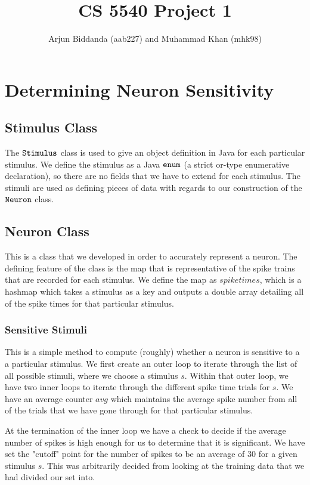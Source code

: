 \documentclass[12pt]{article} %
\title{CS 5540 Project 1}
\author{Arjun Biddanda (aab227) and Muhammad Khan (mhk98)}
\begin{document}
\maketitle

\section{Determining Neuron Sensitivity}
\subsection{Stimulus Class}
The $\tt{Stimulus}$ class is used to give an object definition in Java for each particular stimulus. We define the stimulus as a Java $\tt{enum}$ (a strict or-type enumerative declaration), so there are no fields that we have to extend for each stimulus. The stimuli are used as defining pieces of data with regards to our construction of the $\tt{Neuron}$ class.

\subsection{Neuron Class}
This is a class that we developed in order to accurately represent a neuron. The defining feature of the class is the map that is representative of the spike trains that are recorded for each stimulus. We define the map as $spiketimes$, which is a hashmap which takes a stimulus as a key and outputs a double array detailing all of the spike times for that particular stimulus. 
\subsubsection{Sensitive Stimuli}
This is a simple method to compute (roughly) whether a neuron is sensitive to a a particular stimulus. We first create an outer loop to iterate through the list of all possible stimuli, where we choose a stimulus $s$. Within that outer loop, we have two inner loops to iterate through the different spike time trials for $s$. We have an average counter $avg$ which maintains the average spike number from all of the trials that we have gone through for that particular stimulus. 

At the termination of the inner loop we have a check to decide if the average number of spikes is high enough for us to determine that it is significant. We have set the "cutoff" point for the number of spikes to be an average of 30 for a given stimulus $s$. This was arbitrarily decided from looking at the training data that we had divided our set into. 
\end{document}
